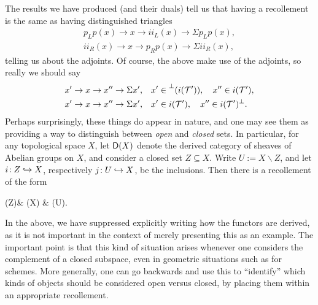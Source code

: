 The results we have produced (and their duals) tell us that having a recollement is the same as having distinguished triangles
\begin{align*}
	p_Lp(x) \to x \to ii_L(x) \to \Sigma p_Lp(x), \\
	ii_R(x) \to x \to p_Rp(x) \to \Sigma ii_R(x),
\end{align*}
telling us about the adjoints. Of course, the above make use of the adjoints, so really we should say
\begin{align*}
	x' \to x \to x'' \to \Sigma x',\quad &x'\in\prescript{\perp}{}{(i(\ensuremath{\mathcal{T}}'))},\quad x''\in i(\mathcal{T}'), \\
	x' \to x \to x'' \to \Sigma x',\quad &x'\in i(\mathcal{T}'),\quad x''\in i(\mathcal{T}')^\perp.
\end{align*}
Perhaps surprisingly, these things do appear in nature, and one may see them as providing a way to distinguish between \emph{open} and \emph{closed} sets.
In particular, for any topological space \(X\), let \(\mathsf{D}(X)\) denote the derived category of sheaves of Abelian groups on \(X\), and consider a closed
set \(Z\subseteq X\). Write \(U := X\backslash Z\), and let \(i\!:Z\hookrightarrow X\), respectively \(j\!:U\hookrightarrow X\), be the inclusions. Then there is a recollement of the form
\begin{diagram*}[column sep=large]
	\sfD(Z)\ar[r,"i_*" description,""{below,name=A},""{above,name=AA}] &
		\sfD(X) \ar[r,"j^*" description,""{below,name=C},""{above,name=CC}]\ar[l,bend left,shift left,"i^!",""{above,name=B}]\ar[l,bend right,shift right,"i^*"',""{below,name=BB}] &
		\sfD(U). \ar[l,bend left,shift left,"j_*",""{above,name=D}]\ar[l,bend right,shift right,"j_!"',""{below,name=DD}]
		\ar[from=B,to=A,symbol=\vdash]\ar[from=D,to=C,symbol=\vdash]
		\ar[from=AA,to=BB,symbol=\vdash]\ar[from=CC,to=DD,symbol=\vdash]
\end{diagram*}
In the above, we have suppressed explicitly writing how the functors are derived, as it is not important in the context of merely presenting this as an example.
The important point is that this kind of situation arises whenever one considers the complement of a closed subspace, even in geometric situations such as for schemes. More
generally, one can go backwards and use this to ``identify'' which kinds of objects should be considered open versus closed, by placing them within an appropriate
recollement.

